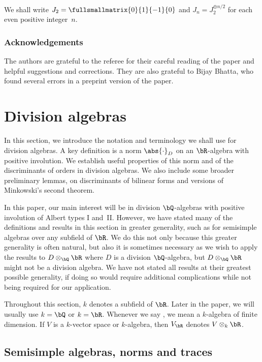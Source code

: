 We shall write $J_2 = \fullsmallmatrix{0}{1}{-1}{0}$ and $J_n = J_2^{\oplus n/2}$ for each even positive integer~$n$.

\subsubsection*{Acknowledgements}
The authors are grateful to the referee for their careful reading of the paper and helpful suggestions and corrections.
They are also grateful to Bijay Bhatta, who found several errors in a preprint version of the paper.

\section{Division algebras}
\label{sec:division-algebras}

In this section, we introduce the notation and terminology we shall use for division algebras. A key definition is a norm $\abs{\cdot}_D$ on an $\bR$-algebra with positive involution. We establish useful properties of this norm and of the discriminants of orders in division algebras.
We also include some broader preliminary lemmas, on discriminants of bilinear forms and versions of Minkowski's second theorem.

In this paper, our main interest will be in division $\bQ$-algebras with positive involution of Albert types I and~II.
However, we have stated many of the definitions and results in this section in greater generality, such as for semisimple algebras over any subfield of $\bR$.
We do this not only because this greater generality is often natural, but also it is sometimes necessary as we wish to apply the results to $D \otimes_\bQ \bR$ where $D$ is a division $\bQ$-algebra, but $D \otimes_\bQ \bR$ might not be a division algebra.
We have not stated all results at their greatest possible generality, if doing so would require additional complications while not being required for our application.

Throughout this section, $k$ denotes a subfield of $\bR$.
Later in the paper, we will usually use $k = \bQ$ or $k = \bR$.
Whenever we say , we mean a $k$-algebra of finite dimension.
If $V$ is a $k$-vector space or $k$-algebra, then $V_\bR$ denotes $V \otimes_k \bR$.

\subsection{Semisimple algebras, norms and traces} \label{subsec:semisimple-algebras}

